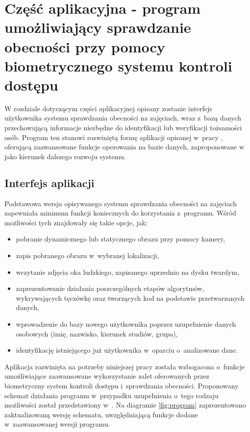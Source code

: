\chapter{Część aplikacyjna - program umożliwiający sprawdzanie obecności przy pomocy biometrycznego systemu kontroli dostępu}
\label{cha:systemKontroli}

W rozdziale dotyczącym części aplikacyjnej opisany zostanie interfejs użytkownika systemu sprawdzania obecności na zajęciach, wraz z~bazą danych przechowującą informacje niezbędne do identyfikacji lub weryfikacji tożsamości osób. Program ten stanowi rozwiniętą formę aplikacji opisanej w~pracy \cite{Gl11}, oferującą zaawansowane funkcje operowania na bazie danych, zaproponowane w~\cite{Gl11} jako kierunek dalszego rozwoju systemu.

\section{Interfejs aplikacji}
\label{sec:aplikacja}

Podstawowa wersja opisywanego systemu sprawdzania obecności na zajęciach zapewniała minimum funkcji koniecznych do korzystania z~programu. Wśród możliwości tych znajdowały się takie opcje, jak:
\begin{itemize}
\item pobranie dynamicznego lub statycznego obrazu przy pomocy kamery,
\item zapis pobranego obrazu w~wybranej lokalizacji,
\item wczytanie zdjęcia oka ludzkiego, zapisanego uprzednio na dysku twardym,
\item zaprezentowanie działania poszczególnych etapów algorytmów, wykrywających tęczówkę oraz tworzących kod na podstawie przetwarzanych danych,
\item wprowadzenie do bazy nowego użytkownika poprzez uzupełnienie danych osobowych (imię, nazwisko, kierunek studiów, grupa),
\item identyfikację istniejącego już użytkownika w~oparciu o~analizowane dane.
\end{itemize}

Aplikacja rozwinięta na potrzeby niniejszej pracy została wzbogacona o~funkcje umożliwiające zaawansowane wykorzystanie zalet oferowanych przez biometryczny system kontroli dostępu i~sprawdzania obecności. Proponowany schemat działania programu w~przypadku uzupełnienia o~tego rodzaju możliwości został przedstawiony w~\cite{Gl11}. Na diagramie \ref{fig:program} zaprezentowano zaktualizowaną wersję schematu, uwzględniającą funkcje dodane w~zaawansowanej wersji programu.


